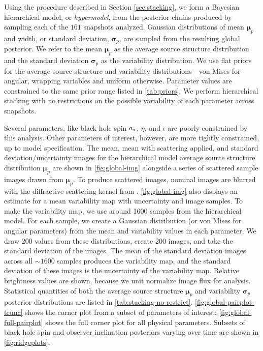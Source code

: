 \documentclass[linenumbers, twocolumn, tighten]{aastex701}
\begin{document}
Using the procedure described in Section \ref{sec:stacking}, we form a Bayesian hierarchical model, or \textit{hypermodel}, from the posterior chains produced by sampling each of the $161$ snapshots analyzed. Gaussian distributions of mean $\boldsymbol{\mu}_p$ and width, or standard deviation, $\boldsymbol{\sigma}_p$, are sampled from the resulting global posterior. We refer to the mean $\boldsymbol{\mu}_p$ as the average source structure distribution and the standard deviation $\boldsymbol{\sigma}_p$ as the variability distribution. We use flat priors for the average source structure and variability distributions---von Mises for angular, wrapping variables and uniform otherwise. Parameter values are constrained to the same prior range listed in \autoref{tab:priors}. We perform hierarchical stacking with no restrictions on the possible variability of each parameter across snapshots. 

Several parameters, like black hole spin $a_{\rm *}$, $\eta$, and $\iota$ are poorly constrained by this analysis. Other parameters of interest, however, are more tightly constrained, up to model specification. The mean, mean with scattering applied, and standard deviation/uncertainty images for the hierarchical model average source structure distribution $\boldsymbol{\mu}_p$ are shown in \autoref{fig:global-img} alongside a series of scattered sample images drawn from $\boldsymbol{\mu}_p$. To produce scattered images, nominal images are blurred with the diffractive scattering kernel from \citet{2018ApJ...865..104J}. \autoref{fig:global-img} also displays an estimate for a mean variability map with uncertainty and image samples. To make the variability map, we use around 1600 samples from the hierarchical model. For each sample, we create a Gaussian distribution (or von Mises for angular parameters) from the mean and variability values in each parameter. We draw 200 values from these distributions, create 200 images, and take the standard deviation of the images. The mean of the standard deviation images across all $\sim 1600$ samples produces the variability map, and the standard deviation of these images is the uncertainty of the variability map. Relative brightness values are shown, because we unit normalize image flux for analysis. Statistical quantities of both the average source structure $\boldsymbol{\mu}_p$ and variability $\boldsymbol{\sigma}_p$ posterior distributions are listed in \autoref{tab:stacking-no-restrict}. \autoref{fig:global-pairplot-trunc} shows the corner plot from a subset of parameters of interest; \autoref{fig:global-full-pairplot} shows the full corner plot for all physical parameters. Subsets of black hole spin and observer inclination posteriors varying over time are shown in \autoref{fig:ridgeplots}.
\end{document}
